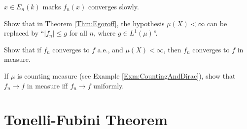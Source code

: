 \begin{rem}
    $x\in E_{n}(k)$ marks $f_{n}(x)$ converges slowly.
\end{rem}
\begin{exc}
    Show that in Theorem \ref{Thm:Egoroff}, the hypothesis 
    $\mu(X)<\infty$ can be replaced by ``$|f_{n}|\le g$ for all 
    $n$, where $g\in L^{1}(\mu)$''.
\end{exc}
\begin{exc}
    Show that if $f_{n}$ converges to $f$ a.e., and $\mu(X)<\infty$, 
    then $f_{n}$ converges to $f$ in measure.
\end{exc}
\begin{exc}
    If $\mu$ is counting measure 
    (see Example \ref{Exm:CountingAndDirac}), show that 
    $f_{n}\rightarrow f$ in measure iff $f_{n}\rightarrow f$ uniformly.
\end{exc}
\section{Tonelli-Fubini Theorem}